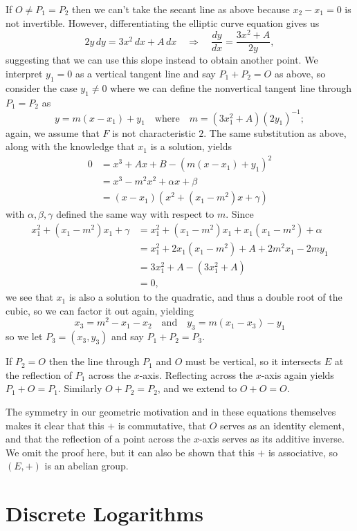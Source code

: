 \documentclass[12pt]{article}
\renewcommand*\implies{\Rightarrow}
\begin{document}
If $O \neq P_1 = P_2$ then we can't take the secant line as above because $x_2 -
x_1 = 0$ is not invertible. However, differentiating the elliptic curve equation
gives us
\[
  2y\,dy = 3x^2\,dx + A\,dx
  \quad\implies\quad
  \frac{dy}{dx} = \frac{3x^2 + A}{2y},
\]
suggesting that we can use this slope instead to obtain another point. We
interpret $y_1 = 0$ as a vertical tangent line and say $P_1 + P_2 = O$ as above,
so consider the case $y_1 \neq 0$ where we can define the nonvertical tangent
line through $P_1 = P_2$ as
\[ y = m(x - x_1) + y_1 \quad\text{where}\quad m = (3x_1^2 + A)(2y_1)^{-1}; \]
again, we assume that $F$ is not characteristic $2$. The same substitution as
above, along with the knowledge that $x_1$ is a solution, yields
\[ \begin{split}
  0
  &= x^3 + Ax + B - (m(x - x_1) + y_1)^2 \\
  &= x^3 - m^2x^2 + \alpha x + \beta \\
  &= (x - x_1)(x^2 + (x_1 - m^2)x + \gamma)
\end{split} \]
with $\alpha, \beta, \gamma$ defined the same way with respect to $m$. Since
\[ \begin{split}
  x_1^2 + (x_1 - m^2)x_1 + \gamma
  &= x_1^2 + (x_1 - m^2)x_1 + x_1(x_1 - m^2) + \alpha \\
  &= x_1^2 + 2x_1(x_1 - m^2) + A + 2m^2x_1 - 2my_1 \\
  &= 3x_1^2 + A - (3x_1^2 + A) \\
  &= 0,
\end{split} \]
we see that $x_1$ is also a solution to the quadratic, and thus a double root of
the cubic, so we can factor it out again, yielding
\[ x_3 = m^2 - x_1 - x_2 \quad\text{and}\quad y_3 = m(x_1 - x_3) - y_1 \]
so we let $P_3 = (x_3, y_3)$ and say $P_1 + P_2 = P_3$.

If $P_2 = O$ then the line through $P_1$ and $O$ must be vertical, so it
intersects $E$ at the reflection of $P_1$ across the $x$-axis. Reflecting across
the $x$-axis again yields $P_1 + O = P_1$. Similarly $O + P_2 = P_2$, and we
extend to $O + O = O$.

The symmetry in our geometric motivation and in these equations themselves makes
it clear that this $+$ is commutative, that $O$ serves as an identity element,
and that the reflection of a point across the $x$-axis serves as its additive
inverse. We omit the proof here, but it can also be shown that this $+$ is
associative, so $(E, +)$ is an abelian group.\cite{book}

\section{Discrete Logarithms}
\end{document}
